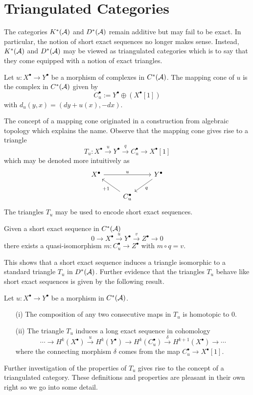\section{Triangulated Categories}
The categories $K^*(\AA)$ and $D^*(\AA)$ remain additive but may fail to be exact.
In particular, the notion of short exact sequences no longer makes sense.
Instead, $K^*(\AA)$ and $D^*(\AA)$ may be viewed as triangulated categories which is to say that they come equipped with a notion of exact triangles.
\begin{definition}
 Let $u:X^\bullet \to Y^\bullet$ be a morphism of complexes in $C^*(\AA)$.
 The mapping cone of $u$ is the complex in $C^*(\AA)$ given by
 $$C_u^\bullet := Y^\bullet \oplus (X^\bullet[1]) $$
 with $d_u(y,x)= (dy + u(x) , -dx)$.
\end{definition}
The concept of a mapping cone originated in a construction from algebraic topology which explains the name.
Observe that the mapping cone gives rise to a triangle
$$T_u:X^\bullet \xrightarrow{u} Y^\bullet \xrightarrow{q} C_u^\bullet \to X^\bullet[1]$$
which may be denoted more intuitively as
$$
 \begin{tikzcd}
   X^\bullet \arrow{rr}{u}& & Y^\bullet \arrow{dl}{q}\\
   & C_u^\bullet\arrow{lu}{+1}
 \end{tikzcd}
$$
The triangles $T_u$ may be used to encode short exact sequences.
\begin{proposition}{\cite[Proposition 1.1.23.]{dimca2004sheaves}}\label{prop: SESYieldsTriangle}
Given a short exact sequence in $C^*(\AA)$
$$0 \to X^\bullet \xrightarrow{u} Y^\bullet \xrightarrow{v} Z^\bullet \to 0 $$
there exists a quasi-isomorphism $m:C_u^\bullet \to Z^\bullet$ with $m\circ q = v$.
\end{proposition}
This shows that a short exact sequence induces a triangle isomorphic to a standard triangle $T_u$ in $D^*(\AA)$.
Further evidence that the triangles $T_u$ behave like short exact sequences is given by the following result.
\begin{proposition}{\cite[Lemma 1.1.20, Proposition 1.1.21]{dimca2004sheaves}}
 Let $u:X^\bullet \to Y^\bullet$ be a morphism in $C^*(\AA)$.
 \begin{enumerate}
   \item[(i)] The composition of any two consecutive maps in $T_u$ is homotopic to $0$.
   \item[(ii)] The triangle $T_u$ induces a long exact sequence in cohomology
   $$\cdots \to H^k(X^\bullet) \xrightarrow{u} H^k(Y^\bullet) \to H^k(C_u^\bullet) \xrightarrow{\delta} H^{k+1}(X^\bullet) \to \cdots$$
   where the connecting morphism $\delta$ comes from the map $C_u^\bullet \to X^\bullet[1]$.
 \end{enumerate}
\end{proposition}
Further investigation of the properties of $T_u$ gives rise to the concept of a triangulated category.
These definitions and properties are pleasant in their own right so we go into some detail.

